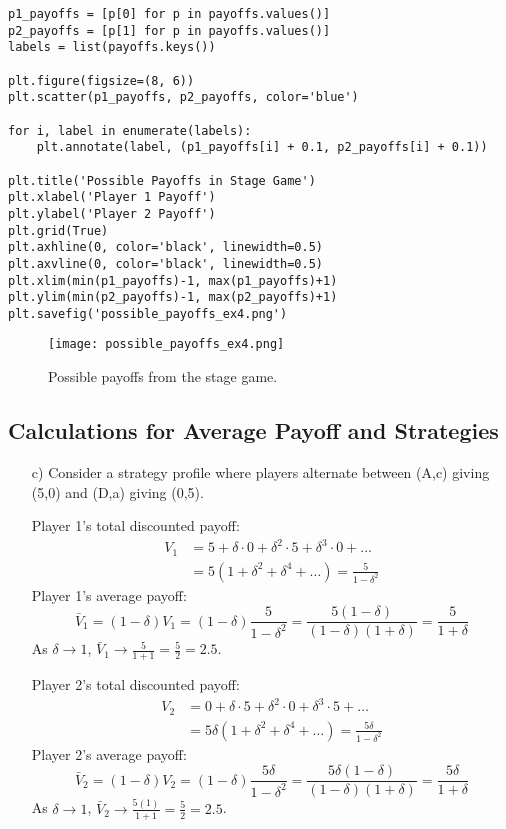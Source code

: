 \begin{solution}
\begin{verbatim}
p1_payoffs = [p[0] for p in payoffs.values()]
p2_payoffs = [p[1] for p in payoffs.values()]
labels = list(payoffs.keys())

plt.figure(figsize=(8, 6))
plt.scatter(p1_payoffs, p2_payoffs, color='blue')

for i, label in enumerate(labels):
    plt.annotate(label, (p1_payoffs[i] + 0.1, p2_payoffs[i] + 0.1))

plt.title('Possible Payoffs in Stage Game')
plt.xlabel('Player 1 Payoff')
plt.ylabel('Player 2 Payoff')
plt.grid(True)
plt.axhline(0, color='black', linewidth=0.5)
plt.axvline(0, color='black', linewidth=0.5)
plt.xlim(min(p1_payoffs)-1, max(p1_payoffs)+1)
plt.ylim(min(p2_payoffs)-1, max(p2_payoffs)+1)
plt.savefig('possible_payoffs_ex4.png')
\end{verbatim}
\begin{figure}[H]
\centering
\texttt{[image: possible\_payoffs\_ex4.png]}
\caption{Possible payoffs from the stage game.}
\label{fig:possible_payoffs_ex4}
\end{figure}

\subsection*{Calculations for Average Payoff and Strategies}
\begin{enumerate}
    \item[c)] Consider a strategy profile where players alternate between (A,c) giving (5,0) and (D,a) giving (0,5).
    
    Player 1's total discounted payoff:
    \begin{align*} V_1 &= 5 + \delta \cdot 0 + \delta^2 \cdot 5 + \delta^3 \cdot 0 + \dots \\ &= 5(1 + \delta^2 + \delta^4 + \dots) = \frac{5}{1-\delta^2} \end{align*}
    Player 1's average payoff:
    \[ \bar{V}_1 = (1-\delta)V_1 = (1-\delta)\frac{5}{1-\delta^2} = \frac{5(1-\delta)}{(1-\delta)(1+\delta)} = \frac{5}{1+\delta} \]
    As $\delta \to 1$, $\bar{V}_1 \to \frac{5}{1+1} = \frac{5}{2} = 2.5$.

    Player 2's total discounted payoff:
    \begin{align*} V_2 &= 0 + \delta \cdot 5 + \delta^2 \cdot 0 + \delta^3 \cdot 5 + \dots \\ &= 5\delta(1 + \delta^2 + \delta^4 + \dots) = \frac{5\delta}{1-\delta^2} \end{align*}
    Player 2's average payoff:
    \[ \bar{V}_2 = (1-\delta)V_2 = (1-\delta)\frac{5\delta}{1-\delta^2} = \frac{5\delta(1-\delta)}{(1-\delta)(1+\delta)} = \frac{5\delta}{1+\delta} \]
    As $\delta \to 1$, $\bar{V}_2 \to \frac{5(1)}{1+1} = \frac{5}{2} = 2.5$.
\end{enumerate}


\end{solution}
